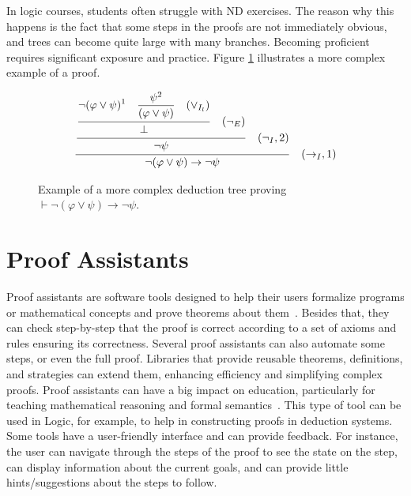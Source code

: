 In logic courses, students often struggle with \gls{ND} exercises. The reason why this happens is the fact that some steps in the proofs are not immediately obvious, and trees can become quite large with many branches. Becoming proficient requires significant exposure and practice. Figure \ref{tab:proof-tree1} illustrates a more complex example of a proof.
\begin{figure}[h!]
    \centering
    \[
    \frac{\displaystyle \frac{\displaystyle \frac{
    \displaystyle \neg (\varphi \lor \psi)^1 \quad \displaystyle \frac{\psi^2}{(\varphi \lor \psi) \strut} \quad (\lor_{I_l}) \strut}
    {\displaystyle \bot \strut} \quad (\displaystyle \neg_E)\strut} {\displaystyle \neg \psi \strut} \quad (\neg_I, 2) \strut}
    {\neg (\varphi \lor \psi) \to \neg \psi \strut} \quad (\to_I, 1)
    \]
    \caption{Example of a more complex deduction tree proving \( \vdash \neg (\varphi \lor \psi) \to \neg \psi \).}
    \label{tab:proof-tree1}
\end{figure}
    




\section{Proof Assistants}
\label{chap:assistants}
Proof assistants are software tools designed to help their users formalize programs or mathematical concepts and prove theorems about them~\cite{andersschlichtkrull_2015_formalization}. Besides that, they can check step-by-step that the proof is correct according to a set of axioms and rules ensuring its correctness. Several proof assistants can also automate some steps, or even the full proof. Libraries that provide reusable theorems, definitions, and strategies can extend them, enhancing efficiency and simplifying complex proofs. Proof assistants can have a big impact on education, particularly for teaching mathematical reasoning and formal semantics~\cite{evmorfiairobartzia_2023_proof}. This type of tool can be used in Logic, for example, to help in constructing proofs in deduction systems. Some tools have a user-friendly interface and can provide feedback. For instance, the user can navigate through the steps of the proof to see the state on the step, can display information about the current goals, and can provide little hints/suggestions about the steps to follow.


